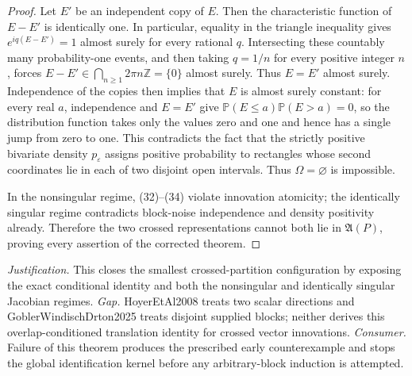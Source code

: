 \documentclass{article}
\begin{document}
\begin{proof}
Let \(E'\) be an independent copy of \(E\).  Then the characteristic function of \(E-E'\) is identically one.  In particular, equality in the triangle inequality gives \(e^{iq(E-E')}=1\) almost surely for every rational \(q\).  Intersecting these countably many probability-one events, and then taking \(q=1/n\) for every positive integer \(n\), forces \(E-E'\in\bigcap_{n\ge1}2\pi n\mathbb Z=\{0\}\) almost surely.  Thus \(E=E'\) almost surely.  Independence of the copies then implies that \(E\) is almost surely constant: for every real \(a\), independence and \(E=E'\) give \(\mathbb P(E\le a)\mathbb P(E>a)=0\), so the distribution function takes only the values zero and one and hence has a single jump from zero to one.  This contradicts the fact that the strictly positive bivariate density \(p_\varepsilon\) assigns positive probability to rectangles whose second coordinates lie in each of two disjoint open intervals.  Thus \(\Omega=\varnothing\) is impossible.

In the nonsingular regime, (32)--(34) violate innovation atomicity; the identically singular regime contradicts block-noise independence and density positivity already.  Therefore the two crossed representations cannot both lie in \(\mathfrak A(P)\), proving every assertion of the corrected theorem.
\end{proof}
\par\smallskip\noindent \textit{Justification.} This closes the smallest crossed-partition configuration by exposing the exact conditional identity and both the nonsingular and identically singular Jacobian regimes. \textit{Gap.} HoyerEtAl2008 treats two scalar directions and GoblerWindischDrton2025 treats disjoint supplied blocks; neither derives this overlap-conditioned translation identity for crossed vector innovations. \textit{Consumer.} Failure of this theorem produces the prescribed early counterexample and stops the global identification kernel before any arbitrary-block induction is attempted.
\end{document}
